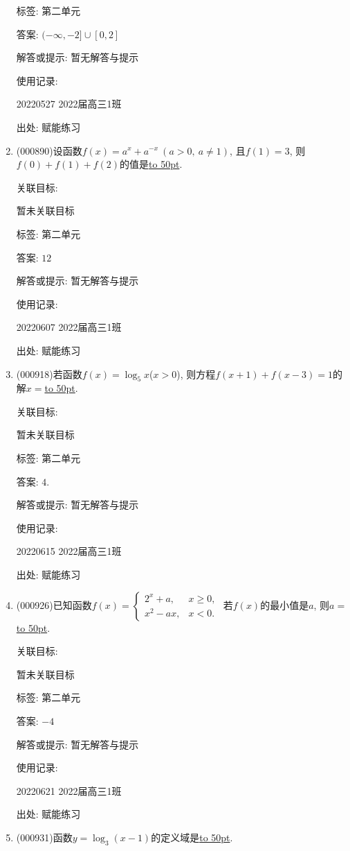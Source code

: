 \documentclass[10pt,a4paper]{article}
\newcommand{\blank}[1]{\underline{\hbox to #1pt{}}}
\begin{document}
\begin{enumerate}[1.]
标签: 第二单元

答案: $(-\infty, -2]\cup [0,2]$

解答或提示: 暂无解答与提示

使用记录:

20220527	2022届高三1班	


出处: 赋能练习
\item { (000890)}设函数$f(x)=a^x+a^{-x}  \ (a>0, \ a\ne 1)$, 且$f(1)=3$, 则$f(0)+f(1)+f(2)$的值是\blank{50}.


关联目标:

暂未关联目标



标签: 第二单元

答案: $12$

解答或提示: 暂无解答与提示

使用记录:

20220607	2022届高三1班	


出处: 赋能练习
\item { (000918)}若函数$f(x)=\log _5 x$($x>0$), 则方程$f(x+1)+f(x-3)=1$的解$x=$\blank{50}.


关联目标:

暂未关联目标



标签: 第二单元

答案: $4$.

解答或提示: 暂无解答与提示

使用记录:

20220615	2022届高三1班	


出处: 赋能练习
\item { (000926)}已知函数$f(x)=\begin{cases}2^x +a, & x\ge 0, \\ x^2-ax, & x<0.\end{cases}$ 若$f(x)$的最小值是$a$, 则$a=$\blank{50}.


关联目标:

暂未关联目标



标签: 第二单元

答案: $-4$

解答或提示: 暂无解答与提示

使用记录:

20220621	2022届高三1班	


出处: 赋能练习
\item { (000931)}函数$y=\log_3 (x-1)$的定义域是\blank{50}.



\end{enumerate}
\end{document}
